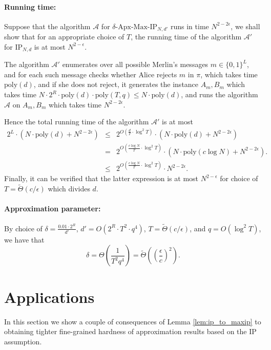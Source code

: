 \documentclass[11pt]{article}
\theoremstyle{plain}
\theoremstyle{remark}
\newcommand{\IP}{\mathrm{IP}}
\newcommand{\Max}{\mathrm{Max}}
\newcommand{\Apx}{\mathrm{Apx}}
\newcommand{\poly}{\mathrm{poly}}
\begin{document}
\paragraph{Running time:} 
Suppose that the algorithm $\mathcal{A}$ for $\delta$-$\Apx$-$\Max$-$\IP_{N,d'}$  runs in time $N^{2-2\epsilon}$, we shall show that for an appropriate choice of $T$, the running time of the algorithm $\mathcal{A'}$ for 
$\IP_{N,d}$ is at most $N^{2-\epsilon}$. 

The algorithm $\mathcal{A'}$ enumerates over all possible Merlin's messages  $m \in \{0,1\}^L$, and for each such message checks whether Alice rejects $m$ in $\pi$, which takes time $\poly(d)$, and if she does not reject, it generates the instance $A_m, B_m$ which takes time $N \cdot 2^R \cdot \poly(d) \cdot \poly(T,q) \leq N \cdot \poly(d)$, and runs the algorithm $\mathcal A$ on $A_m, B_m$ which takes time $N^{2-2\epsilon}$. 

Hence the total running time of the algorithm $\mathcal{A}'$ is at most
\begin{eqnarray*}
 2^L \cdot (N \cdot \poly(d) + N^{2-2\epsilon}) &  \leq & 2^{O  ( \frac d T \cdot \log^2 T)} \cdot (N \cdot \poly(d) + N^{2-2\epsilon}) \\
  &  = & 2^{O (  \frac{c\log N} {T}\cdot \log^2 T)} \cdot (N \cdot \poly(c \log N) + N^{2-2\epsilon}). \\
    &  \leq & 2^{O (  \frac{c\log N} {T}\cdot \log^2 T)} \cdot N^{2-2\epsilon}. 
 \end{eqnarray*}
Finally, it can be verified that the latter expression is at most $N^{2 - \epsilon}$ for  choice of $T = \tilde \Theta( c/\epsilon) $ which divides $d$.


\paragraph{Approximation parameter:}

By choice of 
$\delta = \frac {0.01 \cdot 2^R } {d'}$, $d' = O(2^R \cdot T^2 \cdot q^4)$,  $T = \tilde \Theta( c/\epsilon) $,
and $q = O(\log^2T)$, we have that
$$\delta = \Theta \left( \frac{1} {T^2 q^4} \right) = \tilde \Theta \left(\left(\frac \epsilon c\right)^2\right).$$


\section{Applications}\label{sec:apps}



In this section we show a couple of consequences of Lemma \ref{lem:ip_to_maxip} to obtaining tighter fine-grained hardness of approximation results based on the IP assumption.
\end{document}
